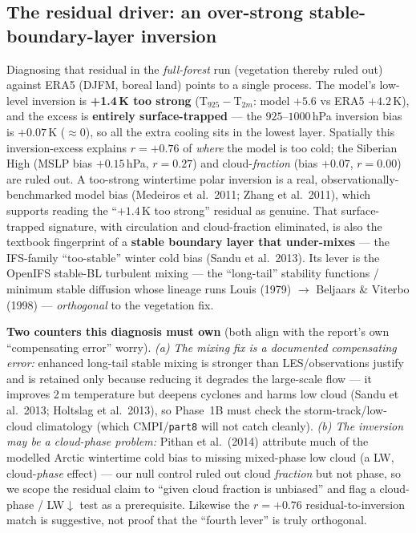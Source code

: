 \documentclass[10pt]{article}
\begin{document}
\subsection{The residual driver: an over-strong stable-boundary-layer inversion}\label{sub:residual}
Diagnosing that residual in the \emph{full-forest} run (vegetation thereby ruled out) against ERA5 (DJFM, boreal
land) points to a single process. The model's low-level inversion is \textbf{+1.4\,K too strong}
(T$_{925}-$T$_{2m}$: model $+5.6$ vs ERA5 $+4.2$\,K), and the excess is \textbf{entirely surface-trapped} --- the
$925$--$1000$\,hPa inversion bias is $+0.07$\,K ($\approx0$), so all the extra cooling sits in the lowest layer.
Spatially this inversion-excess explains \textbf{$r=+0.76$} of \emph{where} the model is too cold; the Siberian
High (MSLP bias $+0.15$\,hPa, $r=0.27$) and cloud-\emph{fraction} (bias $+0.07$, $r=0.00$) are ruled out. A
too-strong wintertime polar inversion is a real, observationally-benchmarked model bias (Medeiros et al.\ 2011;
Zhang et al.\ 2011), which supports reading the ``$+1.4$\,K too strong'' residual as genuine. That surface-trapped
signature, with circulation and cloud-fraction eliminated, is also the textbook fingerprint of a \textbf{stable
boundary layer that under-mixes} --- the IFS-family ``too-stable'' winter cold bias (Sandu et al.\ 2013). Its lever
is the OpenIFS stable-BL turbulent mixing --- the ``long-tail'' stability functions / minimum stable diffusion whose
lineage runs Louis (1979) $\to$ Beljaars \& Viterbo (1998) --- \emph{orthogonal} to the vegetation fix.

\textbf{Two counters this diagnosis must own} (both align with the report's own ``compensating error'' worry).
\emph{(a) The mixing fix is a documented compensating error:} enhanced long-tail stable mixing is stronger than
LES/observations justify and is retained only because reducing it degrades the large-scale flow --- it improves 2\,m
temperature but deepens cyclones and harms low cloud (Sandu et al.\ 2013; Holtslag et al.\ 2013), so Phase~1B must
check the storm-track/low-cloud climatology (which CMPI/\texttt{part8} will not catch cleanly). \emph{(b) The inversion
may be a cloud-phase problem:} Pithan et al.\ (2014) attribute much of the modelled Arctic wintertime cold bias to
missing mixed-phase low cloud (a LW, cloud-\emph{phase} effect) --- our null control ruled out cloud \emph{fraction}
but not phase, so we scope the residual claim to ``given cloud fraction is unbiased'' and flag a cloud-phase /
LW$\downarrow$ test as a prerequisite. Likewise the $r=+0.76$ residual-to-inversion match is suggestive, not proof
that the ``fourth lever'' is truly orthogonal.
\end{document}
